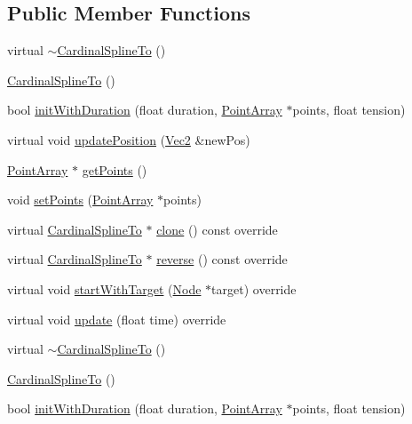 \subsection*{Public Member Functions}
\begin{DoxyCompactItemize}
\item 
virtual \hyperlink{classCardinalSplineTo_a010ec0625178c6c109cf59a8b56cc18a}{$\sim$\+Cardinal\+Spline\+To} ()
\item 
\hyperlink{classCardinalSplineTo_a4e2f955e57a3711c7dc7d0703d229dd4}{Cardinal\+Spline\+To} ()
\item 
bool \hyperlink{classCardinalSplineTo_ac20ad3890618649914a42710e9eee434}{init\+With\+Duration} (float duration, \hyperlink{classPointArray}{Point\+Array} $\ast$points, float tension)
\item 
virtual void \hyperlink{classCardinalSplineTo_a3ab5cf5c0296a69e675c42293c82a606}{update\+Position} (\hyperlink{classVec2}{Vec2} \&new\+Pos)
\item 
\hyperlink{classPointArray}{Point\+Array} $\ast$ \hyperlink{classCardinalSplineTo_a81579b21c78debeaeca0063b46bf9a9d}{get\+Points} ()
\item 
void \hyperlink{classCardinalSplineTo_a303a067d9052d21a6ffc8004c174001b}{set\+Points} (\hyperlink{classPointArray}{Point\+Array} $\ast$points)
\item 
virtual \hyperlink{classCardinalSplineTo}{Cardinal\+Spline\+To} $\ast$ \hyperlink{classCardinalSplineTo_aed2a776edc3e26b2ba7524230edf42de}{clone} () const override
\item 
virtual \hyperlink{classCardinalSplineTo}{Cardinal\+Spline\+To} $\ast$ \hyperlink{classCardinalSplineTo_aecb2ad46af2d58995820c9dfc1f6459f}{reverse} () const override
\item 
virtual void \hyperlink{classCardinalSplineTo_ab1e28aab8fe748bd90cc370efc52bef5}{start\+With\+Target} (\hyperlink{classNode}{Node} $\ast$target) override
\item 
virtual void \hyperlink{classCardinalSplineTo_ae59f479c5041896e373bdcc8af9cdd30}{update} (float time) override
\item 
virtual \hyperlink{classCardinalSplineTo_a1b36baf8a4073953e4cea7028b031202}{$\sim$\+Cardinal\+Spline\+To} ()
\item 
\hyperlink{classCardinalSplineTo_a4e2f955e57a3711c7dc7d0703d229dd4}{Cardinal\+Spline\+To} ()
\item 
bool \hyperlink{classCardinalSplineTo_ac20ad3890618649914a42710e9eee434}{init\+With\+Duration} (float duration, \hyperlink{classPointArray}{Point\+Array} $\ast$points, float tension)

\end{DoxyCompactItemize}
